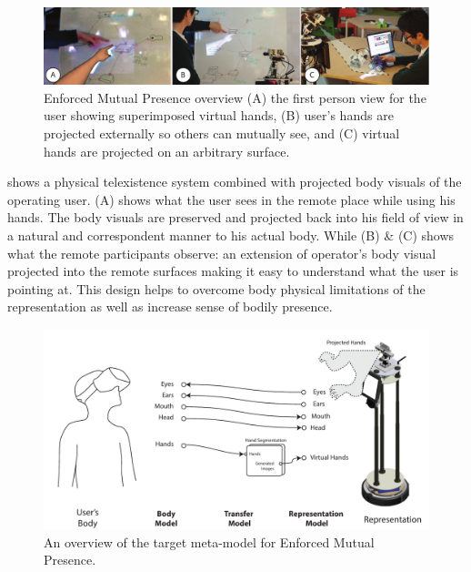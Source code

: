 \begin{figure}[t!] 
\centering
  \captionsetup{justification=centering}
\includegraphics[width=1\textwidth]{figures/eval/ET/ET.pdf}
\caption{Enforced Mutual Presence overview (A) the first person view for the user showing superimposed virtual hands, (B) user's hands are projected externally so others can mutually see, and (C) virtual hands are projected on an arbitrary surface.}
  \label{fig:eval-ET}
\end{figure}

 shows a physical telexistence system combined with projected body visuals of the operating user.  (A) shows what the user sees in the remote place while using his hands. The body visuals are preserved and projected back into his field of view in a natural and correspondent manner to his actual body. While  (B) \& (C) shows what the remote participants observe: an extension of operator's body visual projected into the remote surfaces making it easy to understand what the user is pointing at. This design helps to overcome body physical limitations of the representation as well as increase sense of bodily presence. 



\begin{figure}[htpb]
  \centering
  \includegraphics[width=0.95\linewidth]{figures/eval/EDD/EDD-Mutual.pdf}
  \captionsetup{justification=centering}
  \caption{An overview of the target meta-model for Enforced Mutual Presence.}
  \label{fig:concept-EDD-Mutual}
\end{figure}


